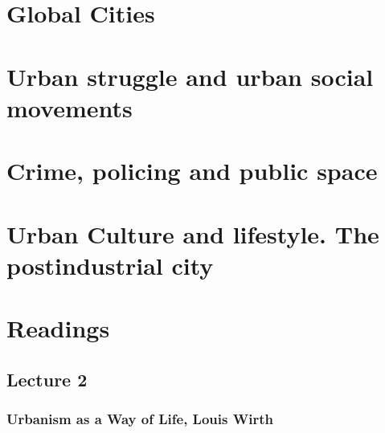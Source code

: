 \documentclass{article}
\begin{document}
\section{Global Cities}
\date{September 28th, 2021}



\section{Urban struggle and urban social movements}
\date{September 28th, 2021}



\section{Crime, policing and public space}
\date{September 28th, 2021}


\section{Urban Culture and lifestyle. The postindustrial city}
\date{September 28th, 2021}


\section{Readings}

\subsection{Lecture 2}

\subsubsection{Urbanism as a Way of Life, Louis Wirth}
\end{document}
